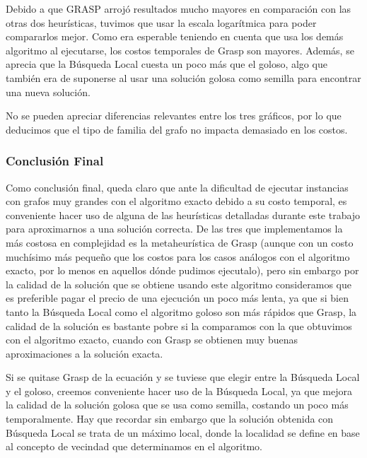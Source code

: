 \quad Debido a que GRASP arrojó resultados mucho mayores en comparación con las otras dos heurísticas, tuvimos que usar la escala logarítmica para poder compararlos mejor. Como era esperable teniendo en cuenta que usa los demás algoritmo al ejecutarse, los costos temporales de Grasp son mayores. Además, se aprecia que la Búsqueda Local cuesta un poco más que el goloso, algo que también era de suponerse al usar una solución golosa como semilla para encontrar una nueva solución.

\quad No se pueden apreciar diferencias relevantes entre los tres gráficos, por lo que deducimos que el tipo de familia del grafo no impacta demasiado en los costos.

\subsubsection{Conclusión Final}

\quad Como conclusión final, queda claro que ante la dificultad de ejecutar instancias con grafos muy grandes con el algoritmo exacto debido a su costo temporal, es conveniente hacer uso de alguna de las heurísticas detalladas durante este trabajo para aproximarnos a una solución correcta. De las tres que implementamos la más costosa en complejidad es la metaheurística de Grasp (aunque con un costo muchísimo más pequeño que los costos para los casos análogos con el algoritmo exacto, por lo menos en aquellos dónde pudimos ejecutalo), pero sin embargo por la calidad de la solución que se obtiene usando este algoritmo consideramos que es preferible pagar el precio de una ejecución un poco más lenta, ya que si bien tanto la Búsqueda Local como el algoritmo goloso son más rápidos que Grasp, la calidad de la solución es bastante pobre si la comparamos con la que obtuvimos con el algoritmo exacto, cuando con Grasp se obtienen muy buenas aproximaciones a la solución exacta.

\quad Si se quitase Grasp de la ecuación y se tuviese que elegir entre la Búsqueda Local y el goloso, creemos conveniente hacer uso de la Búsqueda Local, ya que mejora la calidad de la solución golosa que se usa como semilla, costando un poco más temporalmente. Hay que recordar sin embargo que la solución obtenida con Búsqueda Local se trata de un máximo local, donde la localidad se define en base al concepto de vecindad que determinamos en el algoritmo.

